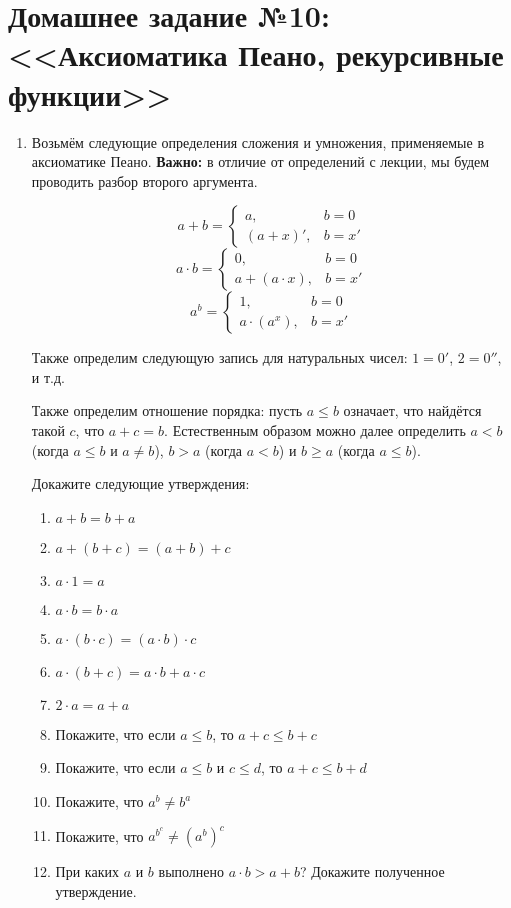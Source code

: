 \documentclass[10pt,a4paper,oneside]{article}
\begin{document}
\section*{Домашнее задание №10: <<Аксиоматика Пеано, рекурсивные функции>>}

\begin{enumerate}

\item Возьмём следующие определения сложения и умножения, применяемые в аксиоматике Пеано.
{\bfseries Важно:} в отличие от определений с лекции, мы будем проводить разбор второго аргумента.

$$a + b = \left\{\begin{array}{ll}
a, & b = 0\\
(a + x)', & b = x'
\end{array}\right.$$
$$a \cdot b = \left\{\begin{array}{ll}
0, & b = 0\\
a + (a \cdot x), & b = x'
\end{array}\right.$$
$$a^b = \left\{\begin{array}{ll}
1, & b = 0\\
a \cdot (a ^ x), & b = x'
\end{array}\right.$$

Также определим следующую запись для натуральных чисел:
$1 = 0'$, $2 = 0''$, и т.д.

Также определим отношение порядка: пусть $a \le b$ означает, 
что найдётся такой $c$, что $a + c = b$. Естественным образом
можно далее определить $a < b$ (когда $a \le b$ и $a \ne b$),
$b > a$ (когда $a < b$) и $b \ge a$ (когда $a \le b$).

Докажите следующие утверждения:
\begin{enumerate}
\item $a + b = b + a$
\item $a + (b + c) = (a+b) + c$
\item $a \cdot 1 = a$
\item $a \cdot b = b \cdot a$
\item $a \cdot (b \cdot c) = (a \cdot b) \cdot c$
\item $a \cdot (b + c) = a \cdot b + a \cdot c$
\item $2 \cdot a = a + a$
\item Покажите, что если $a \le b$, то $a + c \le b + c$
\item Покажите, что если $a \le b$ и $c \le d$, то $a+c \le b+d$
\item Покажите, что $a^b \ne b^a$
\item Покажите, что $a^{b^c} \ne (a^b)^c$
\item При каких $a$ и $b$ выполнено $a\cdot b > a + b$? Докажите полученное утверждение.
\end{enumerate}


\end{enumerate}
\end{document}

